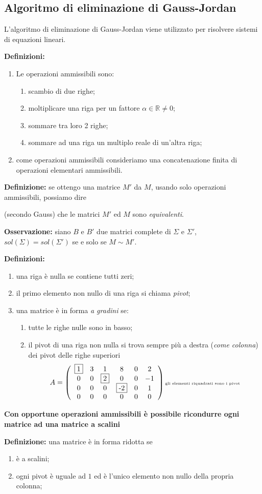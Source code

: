 \documentclass[a4paper]{article}
\newcommand{\n}{\par \noindent \newline}
\begin{document}
\subsection{Algoritmo di eliminazione di Gauss-Jordan}
L'algoritmo di eliminazione di Gauss-Jordan viene utilizzato per risolvere sistemi di equazioni lineari.
\n
\textbf{Definizioni:}
\begin{enumerate}
	\item Le operazioni ammissibili sono:
	\begin{enumerate}
		\item scambio di due  righe;
		\item moltiplicare una riga per un fattore $ \alpha \in \mathbb{R}\neq0 $;
		\item sommare tra loro 2 righe;
		\item sommare ad una riga un multiplo reale di un'altra riga;
	\end{enumerate}
	\item come operazioni ammissibili consideriamo una concatenazione finita di operazioni elementari ammissibili.
\end{enumerate}
\textbf{Definizione: }se ottengo una matrice $M'$ da $M$, usando solo operazioni ammissibili, possiamo dire \par \noindent (secondo Gauss) che le matrici $M'$ ed $M$ sono \textit{equivalenti}.
\n
\textbf{Osservazione: }siano $B$ e $B'$ due matrici complete di $\Sigma$ e $\Sigma'$, $sol(\Sigma)=sol(\Sigma')$ se e solo se $M \sim M'$.
\n
\textbf{Definizioni:}
\begin{enumerate}
	\item una riga è nulla se contiene tutti zeri;
	\item il primo elemento non nullo di una riga si chiama \textit{pivot};
	\item una matrice è in forma \textit{a gradini} se:
	\begin{enumerate}
		\item tutte le righe nulle sono in basso;
		\item il pivot di una riga non nulla si trova sempre più a destra (\textit{come colonna}) dei pivot delle righe superiori
			\begin{equation*}
			A=
			\left(  
			\begin{array}{cccccc}
				\fbox{1} & 3 & 1 & 8 & 0 & 2\\
				0 & 0 & \fbox{2} & 0 &  0 & -1\\
				0 & 0 & 0 & \fbox{-2} & 0 & 1 \\
				0 & 0 & 0 & 0 & 0 & 0
			\end{array}\right)
			\text{{\tiny gli elementi riquadrati sono i pivot}}
		\end{equation*}
	\end{enumerate}
\end{enumerate}
\textbf{Con opportune operazioni ammissibili è possibile ricondurre ogni matrice ad una matrice a scalini}
\n
\textbf{Definizione: }una matrice è in forma ridotta se
\begin{enumerate}
	\item è a scalini;
	\item ogni pivot è uguale ad $1$ ed è l'unico elemento non nullo della propria colonna;
\end{enumerate}
\end{document}
